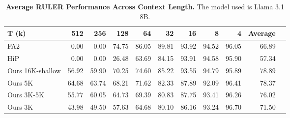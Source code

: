 \begin{table}[htbp]
\centering
\caption{\textbf{Average RULER Performance Across Context Length.} The model used is Llama 3.1 8B.}
\label{tab:tab_ruler_seqlen}
\vspace{1.0em}
\begin{tabular}{lrrrrrrrrrr}\toprule
T (k) &512 &256 &128 &64 &32 &16 &8 &4 &Average \\\midrule
FA2 &\cellcolor[HTML]{ff8370}0.00 &\cellcolor[HTML]{ff8370}0.00 &\cellcolor[HTML]{48b894}74.75 &\cellcolor[HTML]{00b1b0}86.05 &\cellcolor[HTML]{00b1b0}89.81 &\cellcolor[HTML]{00b1b0}93.92 &\cellcolor[HTML]{00b1b0}94.52 &\cellcolor[HTML]{00b1b0}96.05 &\cellcolor[HTML]{7ebd7f}66.89 \\
HiP &\cellcolor[HTML]{ff8370}0.00 &\cellcolor[HTML]{ff8370}0.00 &\cellcolor[HTML]{ffa85d}26.48 &\cellcolor[HTML]{94bf76}63.69 &\cellcolor[HTML]{06b2ad}84.15 &\cellcolor[HTML]{00b1b0}93.91 &\cellcolor[HTML]{00b1b0}94.58 &\cellcolor[HTML]{00b1b0}95.90 &\cellcolor[HTML]{c0c365}57.34 \\
Ours 16K-shallow &\cellcolor[HTML]{c3c364}56.92 &\cellcolor[HTML]{aec16c}59.90 &\cellcolor[HTML]{67bb88}70.25 &\cellcolor[HTML]{49b893}74.60 &\cellcolor[HTML]{00b1b0}85.22 &\cellcolor[HTML]{00b1b0}93.55 &\cellcolor[HTML]{00b1b0}94.79 &\cellcolor[HTML]{00b1b0}95.89 &\cellcolor[HTML]{2bb59f}78.89 \\
Ours 5K &\cellcolor[HTML]{8dbe79}64.68 &\cellcolor[HTML]{94bf76}63.74 &\cellcolor[HTML]{75bc82}68.21 &\cellcolor[HTML]{5dba8b}71.62 &\cellcolor[HTML]{13b3a8}82.33 &\cellcolor[HTML]{00b1b0}87.89 &\cellcolor[HTML]{00b1b0}92.09 &\cellcolor[HTML]{00b1b0}96.41 &\cellcolor[HTML]{2eb69e}78.37 \\
Ours 3K-5K &\cellcolor[HTML]{cbc461}55.77 &\cellcolor[HTML]{adc16c}60.05 &\cellcolor[HTML]{8dbe79}64.73 &\cellcolor[HTML]{6dbb85}69.39 &\cellcolor[HTML]{1db4a4}80.83 &\cellcolor[HTML]{00b1b0}87.75 &\cellcolor[HTML]{00b1b0}93.41 &\cellcolor[HTML]{00b1b0}96.26 &\cellcolor[HTML]{3fb797}76.02 \\
Ours 3K &\cellcolor[HTML]{ffc151}43.98 &\cellcolor[HTML]{f7c850}49.50 &\cellcolor[HTML]{bec366}57.63 &\cellcolor[HTML]{8dbe79}64.68 &\cellcolor[HTML]{22b5a2}80.10 &\cellcolor[HTML]{00b1b0}86.16 &\cellcolor[HTML]{00b1b0}93.24 &\cellcolor[HTML]{00b1b0}96.70 &\cellcolor[HTML]{5eba8b}71.50 \\
\bottomrule
\end{tabular}
\end{table}